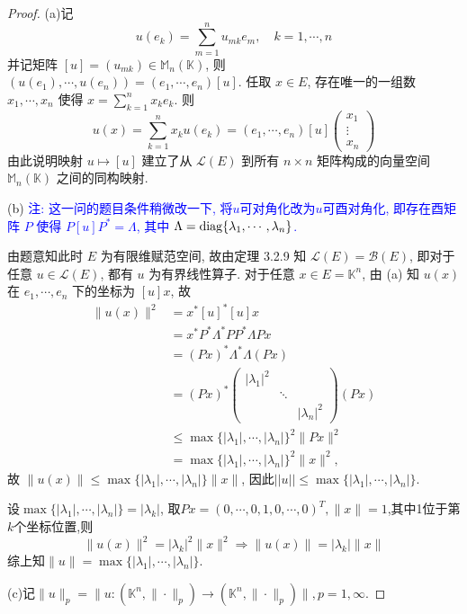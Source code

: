\begin{proof}
(a)记
\[u(e_k)=\sum_{m=1}^n u_{mk}e_m,\quad k=1,\cdots,n\]
并记矩阵 $[u]=(u_{mk})\in\mathbb{M}_n(\mathbb{K})$,
则 $(u(e_1),\cdots,u(e_n))=(e_1,\cdots,e_n)[u]$.
任取 $x\in E$, 存在唯一的一组数 $x_1,\cdots,x_n$ 使得 $x=\sum_{k=1}^n x_ke_k$. 则
\[u(x)=\sum_{k=1}^n x_ku(e_k)=(e_1,\cdots,e_n)[u]
\begin{pmatrix}
    x_1\\\vdots\\x_n
\end{pmatrix}\]
由此说明映射 $u\mapsto [u]$ 建立了从 $\mathcal{L}(E)$ 到所有 $n\times n$ 
矩阵构成的向量空间 $\mathbb{M}_n(\mathbb{K})$ 之间的同构映射.

(b) \textcolor{blue}{注: 这一问的题目条件稍微改一下, 将$u$可对角化改为$u$可酉对角化,
即存在酉矩阵 $P$ 使得 $P[u]P^{*}=\Lambda$, 其中 $\Lambda=\mathrm{diag}\{\lambda_1,\cdots,\lambda_n\}$.}

由题意知此时 $E$ 为有限维赋范空间, 故由定理 3.2.9 知 $\mathcal{L}(E)=\mathcal{B}(E)$,
即对于任意 $u\in\mathcal{L}(E)$, 都有 $u$ 为有界线性算子.
对于任意 $x\in E=\mathbb{K}^n$, 由 (a) 知 $u(x)$ 在 $e_1,\cdots,e_n$
下的坐标为 $[u]x$, 故
\begin{align*}
    \|u(x)\|^2
    & =x^{*}[u]^{*}[u]x\\
    & =x^{*}P^{*}\Lambda^{*}PP^{*}\Lambda Px\\
    & =(Px)^{*}\Lambda^{*}\Lambda(Px)\\
    & =(Px)^{*}\begin{pmatrix}|\lambda_1|^2& & \\ &\ddots& \\ & & |\lambda_n|^2\end{pmatrix}(Px)\\
    & \leq\max\{|\lambda_1|,\cdots,|\lambda_n|\}^2\|Px\|^2\\&=\max\{|\lambda_1|,\cdots,|\lambda_n|\}^2\|x\|^2,
\end{align*}
故 $\|u(x)\|\leq \max\{|\lambda_1|,\cdots,|\lambda_n|\}\|x\|$, 因此$||u||\leq \max\{|\lambda_1|,\cdots,|\lambda_n|\}$.

设$\max\{|\lambda_1|,\cdots,|\lambda_n|\}=|\lambda_k|$, 取$Px=(0,\cdots,0,1,0,\cdots,0)^T,\|x\|=1$,其中1位于第$k$个坐标位置,则
\[\|u(x)\|^2=|\lambda_k|^2\|x\|^2\Rightarrow \|u(x)\|=|\lambda_k|\|x\|\]
综上知$\|u\|=\max\{|\lambda_1|,\cdots,|\lambda_n|\}$.

(c)记$\|u\|_p=\|u:(\mathbb{K}^n,\|\cdot\|_p)\to(\mathbb{K}^n,\|\cdot\|_p)\|,p=1,\infty$.


\end{proof}
